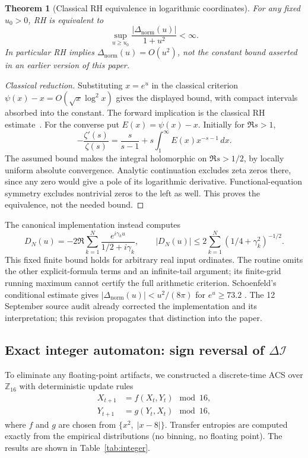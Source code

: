 \documentclass[11pt,a4paper]{article}
\theoremstyle{plain}
\newtheorem{theorem}{Theorem}[section]
\theoremstyle{definition}
\theoremstyle{remark}
\newcommand{\DI}{\Delta\mathcal{I}}
\begin{document}
\begin{theorem}[Classical RH equivalence in logarithmic coordinates]\label{thm:vonKoch-acs}
For any fixed $u_0>0$, RH is equivalent to
\[
 \sup_{u\ge u_0}
 \frac{|\Delta_{\mathrm{norm}}(u)|}{1+u^2}<\infty.
\]
In particular RH implies $\Delta_{\mathrm{norm}}(u)=O(u^2)$, not the
constant bound asserted in an earlier version of this paper.
\end{theorem}
\begin{proof}[Classical reduction]
Substituting $x=e^u$ in the classical criterion
$\psi(x)-x=O(\sqrt{x}\log^2x)$ gives the displayed bound, with compact
intervals absorbed into the constant. The forward implication is the
classical RH estimate~\cite{vonKoch1901,Schoenfeld1976}.
For the converse put $E(x)=\psi(x)-x$. Initially for $\Re s>1$,
\[
 -\frac{\zeta'(s)}{\zeta(s)}
 =\frac{s}{s-1}+s\int_1^\infty E(x)x^{-s-1}\,dx.
\]
The assumed bound makes the integral holomorphic on $\Re s>1/2$,
by locally uniform absolute convergence. Analytic continuation excludes
zeta zeros there, since any zero would give a pole of its logarithmic
derivative. Functional-equation symmetry excludes nontrivial zeros to
the left as well. This proves the equivalence, not the needed bound.
\end{proof}

The canonical implementation instead computes
\[
 D_N(u)=-2\Re\sum_{k=1}^N\frac{e^{i\gamma_k u}}{1/2+i\gamma_k},
 \qquad |D_N(u)|\le2\sum_{k=1}^N(1/4+\gamma_k^2)^{-1/2}.
\]
This fixed finite bound holds for arbitrary real input ordinates. The routine
omits the other explicit-formula terms and an infinite-tail argument; its
finite-grid running maximum cannot certify the full arithmetic criterion.
Schoenfeld's conditional estimate gives
$|\Delta_{\mathrm{norm}}(u)|<u^2/(8\pi)$ for $e^u\ge73.2$
\cite[Theorem 10, (6.2)]{Schoenfeld1976}.
The 12 September source audit already corrected the implementation and
its interpretation; this revision propagates that distinction into the paper.

\subsection{Exact integer automaton: sign reversal of $\DI$}
\label{sec:comp}

To eliminate any floating-point artifacts, we constructed a discrete-time ACS
over $\mathbb{Z}_{16}$ with deterministic update rules
\begin{align}
  X_{t+1} &= f(X_t, Y_t) \mod 16,\\
  Y_{t+1} &= g(Y_t, X_t) \mod 16,
\end{align}
where $f$ and $g$ are chosen from $\{x^2,\;|x-8|\}$.  Transfer entropies are
computed exactly from the empirical distributions (no binning, no
floating point).  The results are shown in Table~\ref{tab:integer}.
\end{document}
